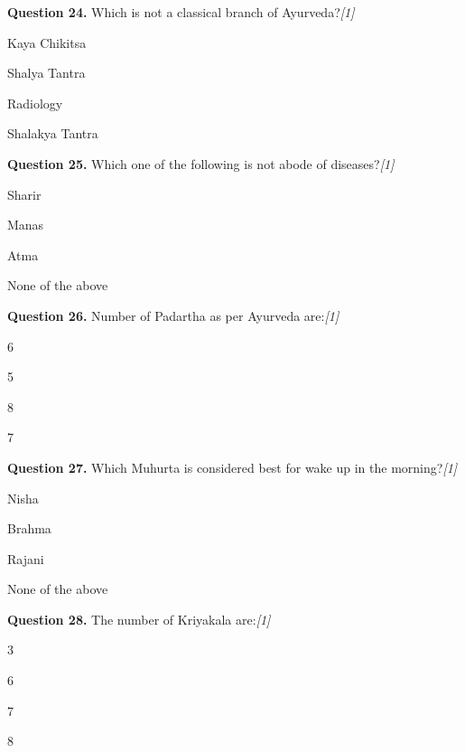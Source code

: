 \documentclass[11pt,a4paper]{article}
\newcommand{\pts}[1]{\hfill   \textit{[#1]}}
\begin{document}
\medskip


\noindent   \textbf{Question 24.} Which is not a classical branch of Ayurveda?\pts{1}

\begin{parts}
  \item Kaya Chikitsa
  \item Shalya Tantra
  \item Radiology
  \item Shalakya Tantra
\end{parts}

\medskip


\noindent   \textbf{Question 25.} Which one of the following is not abode of diseases?\pts{1}

\begin{parts}
  \item Sharir
  \item Manas
  \item Atma
  \item None of the above
\end{parts}

\medskip


\noindent   \textbf{Question 26.} Number of Padartha as per Ayurveda are:\pts{1}

\begin{parts}
  \item 6
  \item 5
  \item 8
  \item 7
\end{parts}

\medskip


\noindent   \textbf{Question 27.} Which Muhurta is considered best for wake up in the morning?\pts{1}

\begin{parts}
  \item Nisha
  \item Brahma
  \item Rajani
  \item None of the above
\end{parts}

\medskip


\noindent   \textbf{Question 28.} The number of Kriyakala are:\pts{1}

\begin{parts}
  \item 3
  \item 6
  \item 7
  \item 8
\end{parts}
\end{document}
